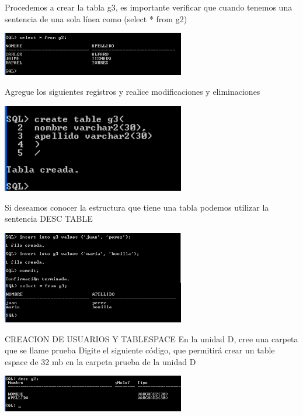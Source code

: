 \begin{enumerate}[1.]
\begin{center}
	\end{center}	
	Procedemos a crear la tabla g3, es importante verificar que cuando tenemos una sentencia de una sola l\'inea como (select * from g2)\\
	\begin{center}
	\includegraphics[width=8cm]{./Imagenes/eje3}
	\end{center}	
	Agregue los siguientes registros y realice modificaciones y eliminaciones\\
	\begin{center}
	\includegraphics[width=8cm]{./Imagenes/eje4}
	\end{center}	
	Si deseamos conocer la estructura que tiene una tabla podemos utilizar la sentencia DESC TABLE\\
	\begin{center}
	\includegraphics[width=8cm]{./Imagenes/eje5}
	\end{center}
	CREACION DE USUARIOS Y TABLESPACE
	En la unidad D, cree una carpeta que se llame prueba
	Digite el siguiente c\'odigo, que permitir\'a crear un table espace de 32 mb en la carpeta prueba de la unidad D\\
	\begin{center}
	\includegraphics[width=8cm]{./Imagenes/eje6}
	\end{center}

\end{enumerate}
